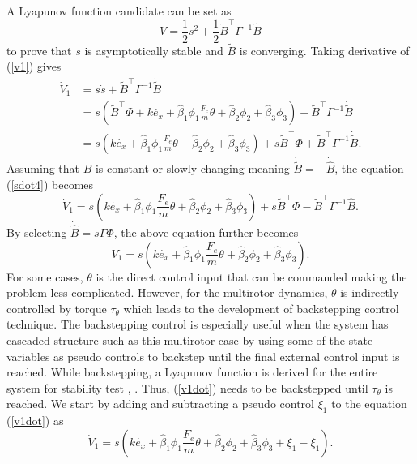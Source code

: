 A Lyapunov function candidate can be set as
\begin{equation}
V=\frac{1}{2}s^2+\frac{1}{2}\tilde{B}^\top \Gamma^{-1}\tilde{B}
\label{v1}
\end{equation}
to prove that $s$ is asymptotically stable and $\tilde{B}$ is converging. Taking derivative of (\ref{v1}) gives
\begin{align}
\dot{V}_1&=s\dot{s}+\tilde{B}^\top \Gamma^{-1}\dot{\tilde{B}}
\\&=s(\tilde{B}^\top\Phi+k\dot{e_x}+\hat{\beta}_1\phi_1\frac{F_e}{m}\theta+\hat{\beta}_2\phi_2+\hat{\beta}_3\phi_3)+\tilde{B}^\top \Gamma^{-1}\dot{\tilde{B}}
\\&=s(k\dot{e_x}+\hat{\beta}_1\phi_1\frac{F_e}{m}\theta+\hat{\beta}_2\phi_2+\hat{\beta}_3\phi_3)+s\tilde{B}^\top\Phi+\tilde{B}^\top \Gamma^{-1}\dot{\tilde{B}}.
\label{sdot4}
\end{align}
Assuming that $B$ is constant or slowly changing meaning $\dot{\tilde{B}}=-\dot{\hat{B}}$, the equation (\ref{sdot4}) becomes 
\begin{equation}
\dot{V}_1=s(k\dot{e_x}+\hat{\beta}_1\phi_1\frac{F_e}{m}\theta+\hat{\beta}_2\phi_2+\hat{\beta}_3\phi_3)+s\tilde{B}^\top\Phi-\tilde{B}^\top \Gamma^{-1}\dot{\hat{B}}.
\end{equation}
By selecting $\dot{\hat{B}}=s\Gamma\Phi$, the above equation further becomes 
\begin{equation}
\dot{V}_1=s(k\dot{e_x}+\hat{\beta}_1\phi_1\frac{F_e}{m}\theta+\hat{\beta}_2\phi_2+\hat{\beta}_3\phi_3).
\label{v1dot}
\end{equation}
For some cases, $\theta$ is the direct control input that can be commanded making the problem less complicated. However, for the multirotor dynamics, $\theta$ is indirectly controlled by torque $\tau_\theta$ which leads to the development of backstepping control technique. The backstepping control is especially useful when the system has cascaded structure such as this multirotor case by using some of the state variables as pseudo controls to backstep until the final external control input is reached. While backstepping, a Lyapunov function is derived for the entire system for stability test \cite{khalil1996noninear}, \cite{raptis2010linear}. Thus, (\ref{v1dot}) needs to be backstepped until $\tau_\theta$ is reached. We start by adding and subtracting a pseudo control $\xi_1$ to the equation (\ref{v1dot}) as
\begin{equation}
\dot{V}_1=s(k\dot{e_x}+\hat{\beta}_1\phi_1\frac{F_e}{m}\theta+\hat{\beta}_2\phi_2+\hat{\beta}_3\phi_3+\xi_1-\xi_1).
\end{equation}
